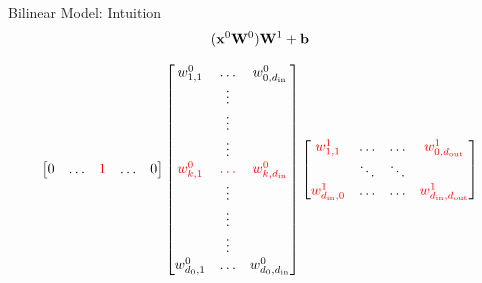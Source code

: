 \documentclass{beamer}
\begin{document}
\begin{frame}{Bilinear Model: Intuition}
  \[ (\mathbf{x}^0 \mathbf{W}^0)\mathbf{W}^1 + \mathbf{b}\]

  \[
    \begin{bmatrix}
      0 & \ldots & \textcolor{red}{1} & \ldots & 0 \\
    \end{bmatrix}
    \begin{bmatrix}
      w^0_{1,1} &  \ldots &w^0_{0, {d_{\mathrm{in}}}}\\
      & \vdots & \\
      & \vdots & \\
      & \vdots & \\
      \textcolor{red}{w^0_{k,1}} &  \textcolor{red}{\ldots} &\textcolor{red}{w^0_{k,{d_{\mathrm{in}}}}}\\
      & \vdots & \\
      & \vdots & \\
      & \vdots & \\
      w^0_{d_0, 1} &  \ldots &w^0_{d_0, {d_{\mathrm{in}}}}\\
    \end{bmatrix}
    \begin{bmatrix}
      \textcolor{red}{w^1_{1,1}} &  \ldots & \ldots &   \textcolor{red}{w^1_{0, {d_{\mathrm{out}}}}}\\
      & \ddots & \ddots &  \\
      \textcolor{red}{w^1_{{d_{\mathrm{in}}},0}} &  \ldots & \ldots & \textcolor{red}{w^1_{{d_{\mathrm{in}}}, {d_{\mathrm{out}}}}}\\
    \end{bmatrix}
  \]

\end{frame}
\end{document}

